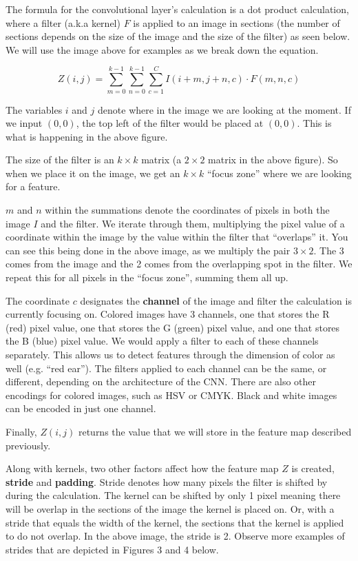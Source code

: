         The formula for the convolutional layer's calculation is a dot product calculation, where a filter (a.k.a kernel) $F$ is applied to an image in sections (the number of sections depends on the size of the image and the size of the filter) as seen below. We will use the image above for examples as we break down the equation.
        
        $$Z(i, j) = \sum^{k-1}_{m=0} \sum^{k-1}_{n=0} \sum^{C}_{c=1}  I(i+m, j+n, c) \cdot F(m, n, c) $$
        
        The variables $i$ and $j$ denote where in the image we are looking at the moment. If we input $(0,0)$, the top left of the filter would be placed at $(0,0)$. This is what is happening in the above figure.
        
        The size of the filter is an $k \times k$ matrix (a $2 
        \times 2$ matrix in the above figure). So when we place it on the image, we get an $k \times k$ ``focus zone'' where we are looking for a feature.
        
        $m$ and $n$ within the summations denote the coordinates of pixels in both the image $I$ and the filter. We iterate through them, multiplying the pixel value of a coordinate within the image by the value within the filter that ``overlaps'' it. You can see this being done in the above image, as we multiply the pair $3 \times 2$. The 3 comes from the image and the 2 comes from the overlapping spot in the filter. We repeat this for all pixels in the ``focus zone'', summing them all up.
        
        The coordinate $c$ designates the \textbf{channel} of the image and filter the calculation is currently focusing on. Colored images have 3 channels, one that stores the R (red) pixel value, one that stores the G (green) pixel value, and one that stores the B (blue) pixel value. We would apply a filter to each of these channels separately. This allows us to detect features through the dimension of color as well (e.g. ``red ear''). The filters applied to each channel can be the same, or different, depending on the architecture of the CNN. There are also other encodings for colored images, such as HSV or CMYK. Black and white images can be encoded in just one channel.
        
        Finally, $Z(i,j)$ returns the value  that we will store in the feature map described previously. 

        Along with kernels, two other factors affect how the feature map $Z$ is created, \textbf{stride} and \textbf{padding}. Stride denotes how many pixels the filter is shifted by during the calculation. The kernel can be shifted by only 1 pixel meaning there will be overlap in the sections of the image the kernel is placed on. Or, with a stride that equals the width of the kernel, the sections that the kernel is applied to do not overlap. In the above image, the stride is 2. Observe more examples of strides that are depicted in Figures 3 and 4 below. 

